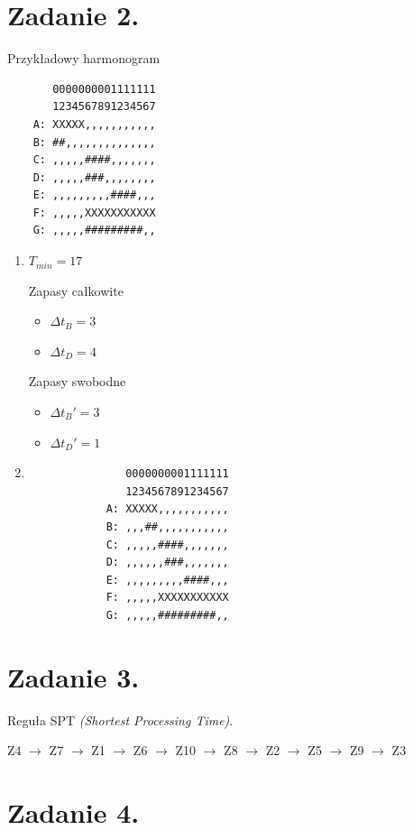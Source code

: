 \documentclass{article}
\begin{document}
\pagebreak
\section*{Zadanie 2.}

Przykładowy harmonogram
\begin{verbatim}
	   0000000001111111
	   1234567891234567
	A: XXXXX,,,,,,,,,,,
	B: ##,,,,,,,,,,,,,,
	C: ,,,,,####,,,,,,,
	D: ,,,,,###,,,,,,,,
	E: ,,,,,,,,,####,,,
	F: ,,,,,XXXXXXXXXXX
	G: ,,,,,#########,,
\end{verbatim}

\begin{enumerate}[label=\alph*)]
	\item $T_{min}= 17$

	      Zapasy całkowite
	      \begin{itemize}
		      \item $\Delta t_B = 3$
		      \item $\Delta t_D = 4$
	      \end{itemize}

	      Zapasy swobodne
	      \begin{itemize}
		      \item $\Delta t_B' = 3$
		      \item $\Delta t_D' = 1$
	      \end{itemize}
	\item
	      \begin{verbatim}
			   0000000001111111
			   1234567891234567
			A: XXXXX,,,,,,,,,,,
			B: ,,,##,,,,,,,,,,,
			C: ,,,,,####,,,,,,,
			D: ,,,,,,###,,,,,,,
			E: ,,,,,,,,,####,,,
			F: ,,,,,XXXXXXXXXXX
			G: ,,,,,#########,,
		   \end{verbatim}
\end{enumerate}

\section*{Zadanie 3.}
Reguła SPT \emph{(Shortest Processing Time)}.

Z4 $\rightarrow$
Z7 $\rightarrow$
Z1 $\rightarrow$
Z6 $\rightarrow$
Z10 $\rightarrow$
Z8 $\rightarrow$
Z2 $\rightarrow$
Z5 $\rightarrow$
Z9 $\rightarrow$
Z3

\section*{Zadanie 4.}
\end{document}

